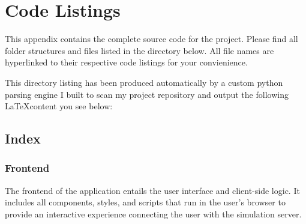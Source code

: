 \chapter{Code Listings}
\label{appendix:code}

This appendix contains the complete source code for the project. Please find all folder structures and files listed in the directory below. All file names are hyperlinked to their respective code listings for your convienience.

This directory listing has been produced automatically by a custom python parsing engine I built to scan my project repository and output the following \LaTeX content you see below:

\section{Index}
\subsection*{Frontend}

The frontend of the application entails the user interface and client-side logic. It includes all components, styles, and scripts that run in the user's browser to provide an interactive experience connecting the user with the simulation server.

